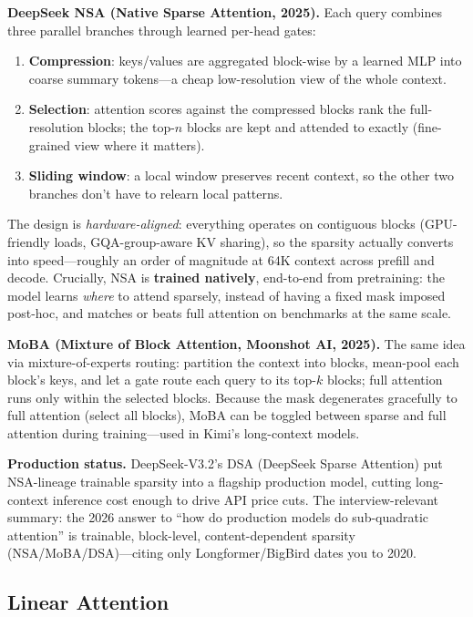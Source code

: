 \textbf{DeepSeek NSA (Native Sparse Attention, 2025).} Each query combines three parallel branches through learned per-head gates:
\begin{enumerate}
    \item \textbf{Compression}: keys/values are aggregated block-wise by a learned MLP into coarse summary tokens---a cheap low-resolution view of the whole context.
    \item \textbf{Selection}: attention scores against the compressed blocks rank the full-resolution blocks; the top-$n$ blocks are kept and attended to exactly (fine-grained view where it matters).
    \item \textbf{Sliding window}: a local window preserves recent context, so the other two branches don't have to relearn local patterns.
\end{enumerate}
The design is \textit{hardware-aligned}: everything operates on contiguous blocks (GPU-friendly loads, GQA-group-aware KV sharing), so the sparsity actually converts into speed---roughly an order of magnitude at 64K context across prefill and decode. Crucially, NSA is \textbf{trained natively}, end-to-end from pretraining: the model learns \textit{where} to attend sparsely, instead of having a fixed mask imposed post-hoc, and matches or beats full attention on benchmarks at the same scale.

\textbf{MoBA (Mixture of Block Attention, Moonshot AI, 2025).} The same idea via mixture-of-experts routing: partition the context into blocks, mean-pool each block's keys, and let a gate route each query to its top-$k$ blocks; full attention runs only within the selected blocks. Because the mask degenerates gracefully to full attention (select all blocks), MoBA can be toggled between sparse and full attention during training---used in Kimi's long-context models.

\textbf{Production status.} DeepSeek-V3.2's DSA (DeepSeek Sparse Attention) put NSA-lineage trainable sparsity into a flagship production model, cutting long-context inference cost enough to drive API price cuts. The interview-relevant summary: the 2026 answer to ``how do production models do sub-quadratic attention'' is trainable, block-level, content-dependent sparsity (NSA/MoBA/DSA)---citing only Longformer/BigBird dates you to 2020.

\subsection{Linear Attention}

